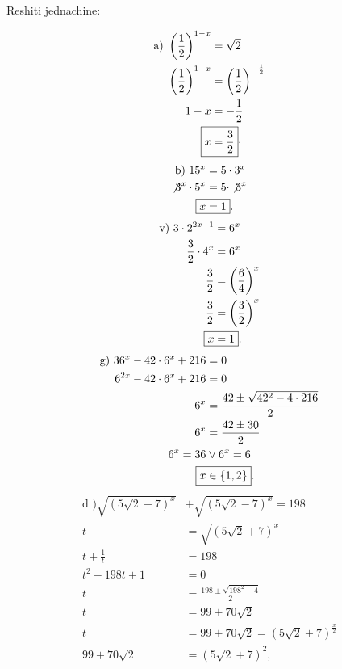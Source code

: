 \documentclass[11pt]{article}
\begin{document}
\newpage

\begin{zad} Reshiti jednachine:\\

\begin{multicols}{2}
\noindent
\begin{align*}
\text{a) } \left( \frac{1}{2}\right)^{1-x}&=\sqrt 2\\
\left( \frac{1}{2}\right)^{1-x}&=\left( \frac{1}{2}\right)^{-\frac{1}{2}}\\
1-x&= -\frac{1}{2}\\
\Aboxed{x&=\frac{3}{2}}\cdot\\
\end{align*}
\begin{align*}
\text{b) } 15^x&=5\cdot 3^x\\
\not{3^x} \cdot 5^x&=5\cdot \not{3^x}\\
\Aboxed{x&=1}.
\end{align*}
\begin{align*}
\text{v) } 3\cdot 2^{2x-1}&=6^x\\
\frac{3}{2}\cdot 4^{x}&=6^x\\
\frac{3}{2}&=\left(\frac{6}{4}\right)^x\\
\frac{3}{2}&=\left(\frac{3}{2}\right)^x\\
\Aboxed{x&=1}.
\end{align*}
\begin{align*}
\text{g) } 36^x-42\cdot 6^x+216&=0\\
6^{2x}-42\cdot 6^x+216&=0\\
6^x&=\frac{42\pm\sqrt{42^2-4\cdot 216}}{2}\\
6^x&=\frac{42\pm 30}{2}\\
6^x=36 &\lor 6^x=6\\
\Aboxed{x&\in\{1,2\}}.
\end{align*}
\begin{align*}
\text{d )} \sqrt{\left(5\sqrt 2 +7\right)^x}&+\sqrt{\left(5\sqrt 2 -7\right)^x}=198\\
t&=\sqrt{\left(5\sqrt 2 +7\right)^x}\\
t+\frac{1}{t}&=198\\
t^2-198t+1&=0\\
t&=\frac{198\pm\sqrt{198^2-4}}{2}\\
t&=99\pm 70\sqrt{2}\\
t&=99\pm 70\sqrt{2}=\left(5\sqrt 2 +7\right)^\frac{x}{2}\\
99+70\sqrt{2}&=(5\sqrt{2}+7)^2,\\

\end{align*}
\end{multicols}
\end{zad}
\end{document}
